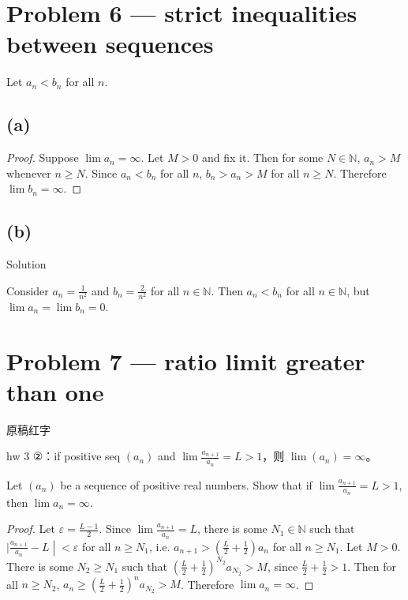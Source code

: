 \section{Problem 6 --- strict inequalities between sequences}

Let \(a_{n} < b_{n}\) for all \(n\).

\subsection{(a)}

\begin{proof}

Suppose \(\lim a_{n} = \infty\). Let \(M > 0\) and fix it. Then for some \(N \in \mathbb{N}\), \(a_{n} > M\) whenever \(n \geq N\). Since \(a_{n} < b_{n}\) for all \(n\), \(b_{n} > a_{n} > M\) for all \(n \geq N\). Therefore \(\lim b_{n} = \infty\).

\end{proof}

\subsection{(b)}

\begin{qlsolution}{Solution}

Consider \(a_{n} = \frac{1}{n^{2}}\) and \(b_{n} = \frac{2}{n^{2}}\) for all \(n \in \mathbb{N}\). Then \(a_{n} < b_{n}\) for all \(n \in \mathbb{N}\), but \(\lim a_{n} = \lim b_{n} = 0\).

\end{qlsolution}

\section{Problem 7 --- ratio limit greater than one}

\begin{qlnote}{原稿红字}

hw 3 ②：if positive seq \(\left( a_{n} \right)\) and \(\lim\frac{a_{n + 1}}{a_{n}} = L > 1\)，则 \(\lim\left( a_{n} \right) = \infty\)。

\end{qlnote}

Let \(\left( a_{n} \right)\) be a sequence of positive real numbers. Show that if \(\lim\frac{a_{n + 1}}{a_{n}} = L > 1\), then \(\lim a_{n} = \infty\).

\begin{proof}

Let \(\varepsilon = \frac{L - 1}{2}\). Since \(\lim\frac{a_{n + 1}}{a_{n}} = L\), there is some \(N_{1} \in \mathbb{N}\) such that \(\left. |\frac{a_{n + 1}}{a_{n}} - L \middle| < \varepsilon \right.\) for all \(n \geq N_{1}\), i.e. \(a_{n + 1} > \left( {\frac{L}{2} + \frac{1}{2}} \right)a_{n}\) for all \(n \geq N_{1}\). Let \(M > 0\). There is some \(N_{2} \geq N_{1}\) such that \(\left( {\frac{L}{2} + \frac{1}{2}} \right)^{N_{2}}a_{N_{2}} > M\), since \(\frac{L}{2} + \frac{1}{2} > 1\). Then for all \(n \geq N_{2}\), \(a_{n} \geq \left( {\frac{L}{2} + \frac{1}{2}} \right)^{n}a_{N_{2}} > M\). Therefore \(\lim a_{n} = \infty\).

\end{proof}

